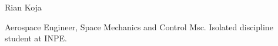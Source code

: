 \documentclass[10pt,journal,compsoc]{IEEEtran}
\begin{document}
% 
\begin{IEEEbiography}{Rian Koja}

Aerospace Engineer, Space Mechanics and Control Msc. Isolated discipline student at INPE.


\end{IEEEbiography}
\end{document}
